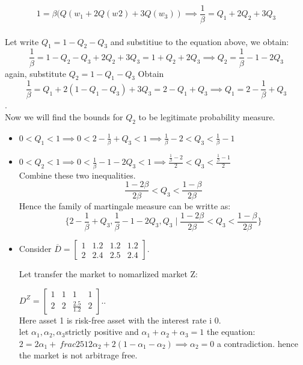 \documentclass[12pt]{article}
\newcommand{\ol}{\overline}
\begin{document}
\begin{enumerate}
$$1 = \beta(Q(w_{1}+2Q(w_{}{2})+3Q(w_{3})) \implies \frac{1}{\beta} = Q_{1} + 2 Q_{2} +3 Q_{3}$$\\
Let write $Q_{1} = 1-Q_{2}-Q_{3}$ and substitiue to the equation above, we obtain:\\
$$\frac{1}{\beta} = 1-Q_{2}-Q_{3} + 2 Q_{2} +3 Q_{3} = 1+Q_{2}+2Q_{3} \implies Q_{2} =\frac{1}{\beta} - 1 - 2Q_{3} $$
again, substitute $Q_{2} = 1-Q_{1}-Q_{3}$ Obtain\\
$$\frac{1}{\beta} = Q_{1} + 2(1-Q_{1}-Q_{3}) +3 Q_{3}  = 2-Q_{1}+Q_{3} \implies Q_{1} = 2-\frac{1}{\beta}+Q_{3}$$.\\ Now we will find the bounds for $Q_{2}$ to be legitimate probability measure.
\begin{itemize}
\item $0<Q_{1}<1 \implies 0<2-\frac{1}{\beta}+Q_{3}<1 \implies \frac{1}{\beta} -2 < Q_{3} < \frac{1}{\beta} - 1$
\item $0<Q_{2}<1 \implies 0<\frac{1}{\beta} - 1 - 2Q_{3} <1 \implies \frac{\frac{1}{\beta} - 2}{2} < Q_{3}<\frac{\frac{1}{\beta}-1}{2}$\\
Combine these two inequalities.\\ 
$$\frac{1-2\beta}{2\beta} < Q_{3}<\frac{1-\beta}{2\beta}$$
Hence the family of martingale measure can be writte as:\\
$$\{2-\frac{1}{\beta}+Q_{3},\frac{1}{\beta} - 1 - 2Q_{3} ,Q_{3} \mid \frac{1-2\beta}{2\beta} < Q_{3}<\frac{1-\beta}{2\beta} \}$$


\item Consider $\ol{D}=
    \left[\begin{array}{llll}
    1 & 1.2 & 1.2 & 1.2 \\
    2 & 2.4 & 2.5 & 2.4
    \end{array}
    \right]$.
   
  Let transfer the market to nomarlized market Z:
  
  $D^{Z} =
 \left[\begin{array}{llll}
    1 & 1& 1 & 1 \\
    2 & 2& \frac{2.5}{1.2} & 2
    \end{array}
    \right]$..\\
    
Here asset 1 is risk-free asset with the interest rate i $0$.\\
let $\alpha_{1}, \alpha_{2}, \alpha_{3} $strictly positive and $\alpha_{1} +\alpha_{2}+ \alpha_{3}=1$
the equation:\\
$2 = 2\alpha_{1} +\ frac{25}{12}\alpha_{2} + 2(1- \alpha_{1} -\alpha_{2}) \implies \alpha_{2} = 0$  a contradiction. hence the market is not arbitrage free.\\


\end{itemize}
\end{enumerate}
\end{document}
